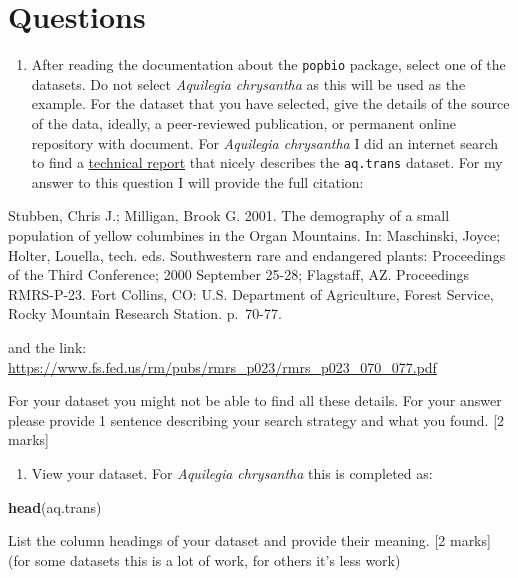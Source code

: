 \documentclass[]{book}
\newenvironment{Shaded}{\begin{snugshade}}{\end{snugshade}}
\newcommand{\KeywordTok}[1]{\textcolor[rgb]{0.13,0.29,0.53}{\textbf{{#1}}}}
\newcommand{\NormalTok}[1]{{#1}}
\providecommand{\tightlist}{%
  \setlength{\itemsep}{0pt}\setlength{\parskip}{0pt}}
\begin{document}
\section{Questions}\label{questions}

\begin{enumerate}
\def\labelenumi{\arabic{enumi}.}
\tightlist
\item
  After reading the documentation about the \texttt{popbio} package,
  select one of the datasets. Do not select \emph{Aquilegia chrysantha}
  as this will be used as the example. For the dataset that you have
  selected, give the details of the source of the data, ideally, a
  peer-reviewed publication, or permanent online repository with
  document. For \emph{Aquilegia chrysantha} I did an internet search to
  find a
  \href{https://www.fs.fed.us/rm/pubs/rmrs_p023/rmrs_p023_070_077.pdf}{technical
  report} that nicely describes the \texttt{aq.trans} dataset. For my
  answer to this question I will provide the full citation:
\end{enumerate}

Stubben, Chris J.; Milligan, Brook G. 2001. The demography of a small
population of yellow columbines in the Organ Mountains. In: Maschinski,
Joyce; Holter, Louella, tech. eds. Southwestern rare and endangered
plants: Proceedings of the Third Conference; 2000 September 25-28;
Flagstaff, AZ. Proceedings RMRS-P-23. Fort Collins, CO: U.S. Department
of Agriculture, Forest Service, Rocky Mountain Research Station.
p.~70-77.

and the link:
\url{https://www.fs.fed.us/rm/pubs/rmrs_p023/rmrs_p023_070_077.pdf}

For your dataset you might not be able to find all these details. For
your answer please provide 1 sentence describing your search strategy
and what you found. {[}2 marks{]}

\begin{enumerate}
\def\labelenumi{\arabic{enumi}.}
\setcounter{enumi}{1}
\tightlist
\item
  View your dataset. For \emph{Aquilegia chrysantha} this is completed
  as:
\end{enumerate}

\begin{Shaded}
\begin{Highlighting}[]
\KeywordTok{head}\NormalTok{(aq.trans)}
\end{Highlighting}
\end{Shaded}

List the column headings of your dataset and provide their meaning. {[}2
marks{]} (for some datasets this is a lot of work, for others it's less
work)
\end{document}
